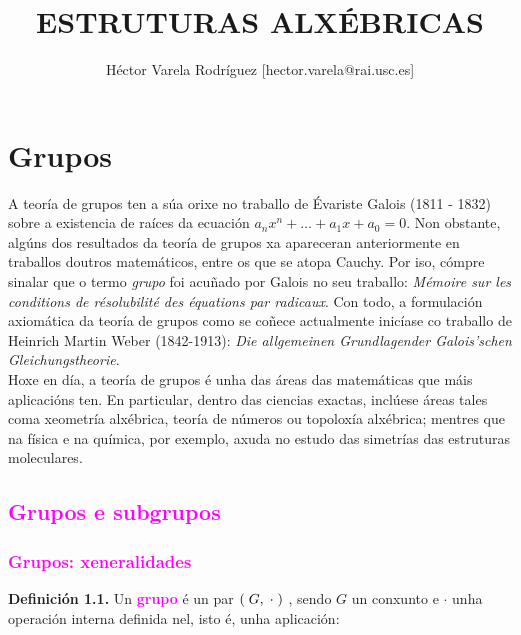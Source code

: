 \documentclass[twoside]{report}
\title{\textbf{ESTRUTURAS ALXÉBRICAS}}
\author{Héctor Varela Rodríguez [hector.varela@rai.usc.es]}
\date{}
\theoremstyle{mystyle}
\begin{document}
\tableofcontents

\thispagestyle{noheader}

\newpage

\chapter[Unidade 1. Grupos]{\textbf{Grupos}}

\thispagestyle{noheader}

    \noindent A teoría de grupos ten a súa orixe no traballo de Évariste Galois (1811 - 1832) sobre a existencia de raíces da ecuación $a_{n}x^{n} + \dots + a_{1}x + a_{0} = 0$. Non obstante, algúns dos resultados da teoría de grupos xa apareceran anteriormente en traballos doutros matemáticos, entre os que se atopa Cauchy. Por iso, cómpre sinalar que o termo \textit{grupo} foi acuñado por Galois no seu traballo: \textit{Mémoire sur les conditions de résolubilité des équations par radicaux}. Con todo, a formulación axiomática da teoría de grupos como se coñece actualmente inicíase co traballo de Heinrich Martin Weber (1842-1913): \textit{Die allgemeinen Grundlagender Galois’schen Gleichungstheorie}.\\
    
    \noindent Hoxe en día, a teoría de grupos é unha das áreas das matemáticas que máis aplicacións ten. En particular, dentro das ciencias exactas, inclúese áreas tales coma xeometría alxébrica, teoría de números ou topoloxía alxébrica; mentres que na física e na química, por exemplo, axuda no estudo das simetrías das estruturas moleculares.

\textcolor{magenta}{\section{Grupos e subgrupos}}

\textcolor{magenta}{\subsection{Grupos: xeneralidades}}

\vspace{5mm}

\noindent \textbf{Definición 1.1.} Un \textbf{\textcolor{magenta}{grupo}} é un par $( \hspace{1mm} G, \hspace{1mm} \cdot \hspace{1mm})$ , sendo $G$ un conxunto e  $\cdot$ unha operación interna definida nel, isto é, unha aplicación:
\end{document}
